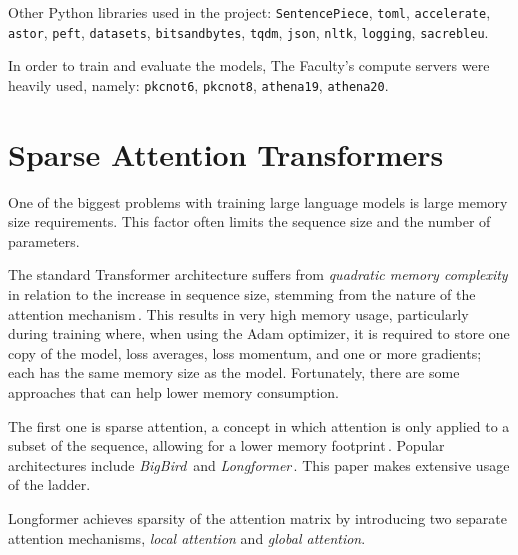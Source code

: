     Other Python libraries used in the project: \verb|SentencePiece|, \verb|toml|, \verb|accelerate|, \verb|astor|, \verb|peft|,  \verb|datasets|, \verb|bitsandbytes|, \verb|tqdm|, \verb|json|, \verb|nltk|, \verb|logging|, \verb|sacrebleu|.
    
    In order to train and evaluate the models, The Faculty's compute servers were heavily used, namely: \verb|pkcnot6|, \verb|pkcnot8|, \verb|athena19|, \verb|athena20|.
    
    \section{Sparse Attention Transformers} \label{led}
    One of the biggest problems with training large language models is large memory size requirements. This factor often limits the sequence size and the number of parameters.

    The standard Transformer architecture suffers from \emph{quadratic memory complexity} in relation to the increase in sequence size, stemming from the nature of the attention mechanism\,\cite{child2019generating}. This results in very high memory usage, particularly during training where, when using the Adam optimizer, it is required to store one copy of the model, loss averages, loss momentum, and one or more gradients; each has the same memory size as the model. Fortunately, there are some approaches that can help lower memory consumption.

    \medskip
    
    The first one is sparse attention, a concept in which attention is only applied to a subset of the sequence, allowing for a lower memory footprint\,\cite{child2019generating}. Popular architectures include \emph{BigBird}\,\cite{zaheer2021big} and \emph{Longformer}\,\cite{beltagy2020longformer}. This paper makes extensive usage of the ladder. 

        Longformer achieves sparsity of the attention matrix by introducing two separate attention mechanisms, \emph{local attention} and \emph{global attention}.
        
